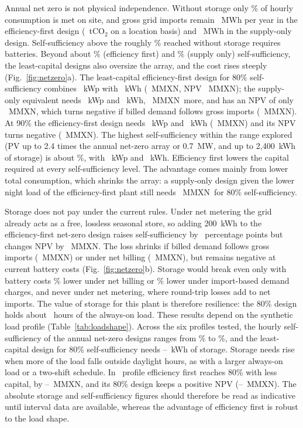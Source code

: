 \documentclass[preprint,12pt,authoryear]{elsarticle}
\newcommand{\MXN}{MXN}
\begin{document}
Annual net zero is not physical independence. Without storage only \nSSNZE\% of hourly consumption is met on site, and gross grid imports remain \nImpNZE~MWh per year in the efficiency-first design (\nCOGrossNZE~tCO$_2$ on a location basis) and \nImpNZS~MWh in the supply-only design. Self-sufficiency above the roughly \nFirstBattery\% reached without storage requires batteries. Beyond about \nFirstOversizeE\% (efficiency first) and \nFirstOversizeS\% (supply only) self-sufficiency, the least-capital designs also oversize the array, and the cost rises steeply (Fig.~\ref{fig:netzero}a). The least-capital efficiency-first design for 80\% self-sufficiency combines \nKWpSSE~kWp with \nBatSSE~kWh (\nCapexSSE~M\MXN, NPV \nNPVSSE~M\MXN); the supply-only equivalent needs \nKWpSSS~kWp and \nBatSSS~kWh, \nSSEightyCapexSave~M\MXN\ more, and has an NPV of only \nNPVSSS~M\MXN, which turns negative if billed demand follows gross imports (\nNPVImpSSS~M\MXN). At 90\% the efficiency-first design needs \nKWpSSNE~kWp and \nBatSSNE~kWh (\nCapexSSNE~M\MXN) and its NPV turns negative (\nNPVSSNE~M\MXN). The highest self-sufficiency within the range explored (PV up to 2.4 times the annual net-zero array or 0.7~MW, and up to 2,400~kWh of storage) is about \nMaxSSE\%, with \nMaxSSKWp~kWp and \nMaxSSBat~kWh. Efficiency first lowers the capital required at every self-sufficiency level. The advantage comes mainly from lower total consumption, which shrinks the array: a supply-only design given the lower night load of the efficiency-first plant still needs \nSupplyLowNightCapex~M\MXN\ for 80\% self-sufficiency.

Storage does not pay under the current rules. Under net metering the grid already acts as a free, lossless seasonal store, so adding 200~kWh to the efficiency-first net-zero design raises self-sufficiency by \nBatMargSS\ percentage points but changes NPV by \nBatMargNM~M\MXN. The loss shrinks if billed demand follows gross imports (\nBatMargImp~M\MXN) or under net billing (\nBatMargNB~M\MXN), but remains negative at current battery costs (Fig.~\ref{fig:netzero}b). Storage would break even only with battery costs \nBatBENB\% lower under net billing or \nBatBEImp\% lower under import-based demand charges, and never under net metering, where round-trip losses add to net imports. The value of storage for this plant is therefore resilience: the 80\% design holds about \nAutoSSE~hours of the always-on load. These results depend on the synthetic load profile (Table~\ref{tab:loadshape}). Across the six profiles tested, the hourly self-sufficiency of the annual net-zero designs ranges from \nLSSSLo\% to \nLSSSHi\%, and the least-capital design for 80\% self-sufficiency needs \nLSBatLo--\nLSBatHi~kWh of storage. Storage needs rise when more of the load falls outside daylight hours, as with a larger always-on load or a two-shift schedule. In \nLSAllCheaper\ profile efficiency first reaches 80\% with less capital, by \nLSSaveLo--\nLSSaveHi~M\MXN, and its 80\% design keeps a positive NPV (\nLSNPVLo--\nLSNPVHi~M\MXN). The absolute storage and self-sufficiency figures should therefore be read as indicative until interval data are available, whereas the advantage of efficiency first is robust to the load shape.
\end{document}
